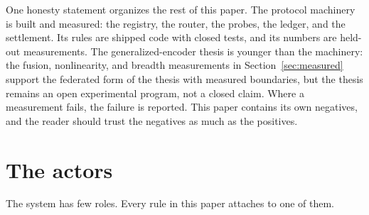 \documentclass[11pt]{article}
\begin{document}
One honesty statement organizes the rest of this paper. The
protocol machinery is built and measured: the registry, the
router, the probes, the ledger, and the settlement. Its rules are
shipped code with closed tests, and its numbers are held-out
measurements. The generalized-encoder thesis is younger than the
machinery: the fusion, nonlinearity, and breadth measurements in
Section~\ref{sec:measured} support the federated form of the
thesis with measured boundaries, but the thesis remains an
open experimental program, not a closed claim. Where a
measurement fails, the failure is reported. This paper contains
its own negatives, and the reader should trust the negatives as
much as the positives.

\section{The actors}

The system has few roles. Every rule in this paper attaches to one
of them.
\end{document}
